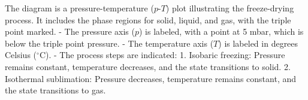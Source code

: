 The diagram is a pressure-temperature (\(p\)-\(T\)) plot illustrating the freeze-drying process. It includes the phase regions for solid, liquid, and gas, with the triple point marked.  
- The pressure axis (\(p\)) is labeled, with a point at 5 mbar, which is below the triple point pressure.  
- The temperature axis (\(T\)) is labeled in degrees Celsius (\(^\circ\text{C}\)).  
- The process steps are indicated:  
  1. Isobaric freezing: Pressure remains constant, temperature decreases, and the state transitions to solid.  
  2. Isothermal sublimation: Pressure decreases, temperature remains constant, and the state transitions to gas.